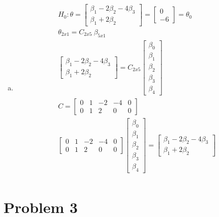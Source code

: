 \documentclass{article}
\newcommand{\B}{\beta}
\begin{document}
\begin{flushleft}
\begin{enumerate}[(a)]
	\item 
\begin{multline*}\\
H_0: \theta=\left[\begin{array}{r}
\B_1-2\B_2-4\B_3\\
\B_1+2\B_2
\end{array}\right]=\left[\begin{array}{r}
0\\
-6
\end{array}\right]=\theta_0\\
\theta_{2x1}=C_{2x5} \ \B_{5x1}\\
\left[\begin{array}{r}
\B_1-2\B_2-4\B_3\\
\B_1+2\B_2
\end{array}\right]=C_{2x5}\left[\begin{array}{r}
\B_0\\
\B_1\\
\B_2\\
\B_3\\
\B_4
\end{array}\right]\\
C=\left[\begin{array}{rrrrr}
0&1&-2&-4&0\\
0&1&2&0&0
\end{array}\right]\\
\left[\begin{array}{rrrrr}
0&1&-2&-4&0\\
0&1&2&0&0
\end{array}\right]\left[\begin{array}{r}
\B_0\\
\B_1\\
\B_2\\
\B_3\\
\B_4
\end{array}\right]=\left[\begin{array}{r}
\B_1-2\B_2-4\B_3\\
\B_1+2\B_2
\end{array}\right]\\
\end{multline*}
	
\end{enumerate}
\pagebreak
	\section*{Problem 3}
	

\end{flushleft}
\end{document}
